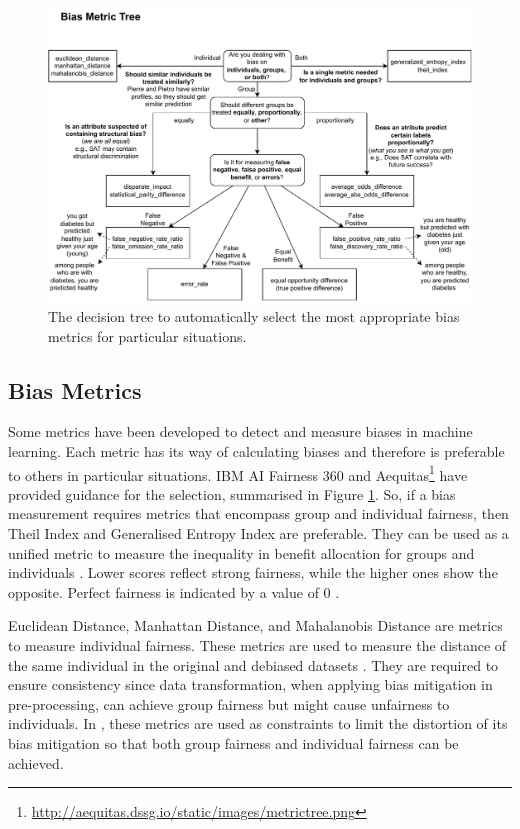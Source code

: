 \documentclass[sigconf]{acmart}
\begin{document}
	\begin{figure}[h]
		\includegraphics[width=\linewidth]{figures/wizard-metric}
		\caption{The decision tree to automatically select the most appropriate bias metrics for particular situations.}
		\label{fig:wizard-metric}
	\end{figure}
	
	\subsection{Bias Metrics}
	\label{sec:bias_metrics}	
	Some metrics have been developed to detect and measure biases in machine learning. Each metric has its way of calculating biases and therefore is preferable to others in particular situations. IBM AI Fairness 360 \cite{mahoney2020ai,ibmaif3602022guidance} and Aequitas\footnote{\url{http://aequitas.dssg.io/static/images/metrictree.png}} have provided guidance for the selection, summarised in Figure \ref{fig:wizard-metric}. So, if a bias measurement requires metrics that encompass group and individual fairness, then Theil Index \cite{conceicao2000theyoung,bellamy2018ai} and Generalised Entropy Index \cite{speicher2018unified} are preferable. They can be used as a unified metric to measure the inequality in benefit allocation for groups and individuals \cite{ibmaif3602022guidance,mahoney2020ai}. Lower scores reflect strong fairness, while the higher ones show the opposite. Perfect fairness is indicated by a value of 0 \cite{lale2022doc}. 
	
	Euclidean Distance, Manhattan Distance, and Mahalanobis Distance are metrics to measure individual fairness. These metrics are used to measure the distance of the same individual in the original and debiased datasets \cite{bellamy2018ai}. They are required to ensure consistency since data transformation, when applying bias mitigation in pre-processing, can achieve group fairness but might cause unfairness to individuals. In \cite{calmon2017optimized},   these metrics are used as constraints to limit the distortion of its bias mitigation so that both group fairness and individual fairness can be achieved. 
	
\end{document}
